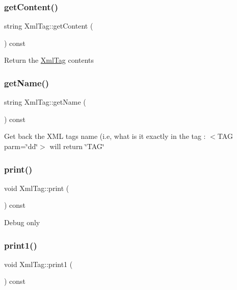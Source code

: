 \subsubsection{\texorpdfstring{get\+Content()}{getContent()}}
{\footnotesize\ttfamily string Xml\+Tag\+::get\+Content (\begin{DoxyParamCaption}{ }\end{DoxyParamCaption}) const}

Return the \hyperlink{classXmlTag}{Xml\+Tag} contents \mbox{\label{classXmlTag_a75a408a38dc1e24965b64bf46a23f57f}} 
\subsubsection{\texorpdfstring{get\+Name()}{getName()}}
{\footnotesize\ttfamily string Xml\+Tag\+::get\+Name (\begin{DoxyParamCaption}{ }\end{DoxyParamCaption}) const}

Get back the X\+ML tag\textquotesingle{}s name (i.\+e, what is it exactly in the tag \+: $<$\+T\+A\+G parm=\char`\"{}dd\char`\"{}$>$ will return \char`\"{}\+T\+A\+G\char`\"{} \mbox{\label{classXmlTag_a75522d91e1514e5180d66341dd92f4af}} 
\subsubsection{\texorpdfstring{print()}{print()}}
{\footnotesize\ttfamily void Xml\+Tag\+::print (\begin{DoxyParamCaption}{ }\end{DoxyParamCaption}) const}

Debug only \mbox{\label{classXmlTag_a240d1daa84c853ca638208ee26cd6842}} 
\subsubsection{\texorpdfstring{print1()}{print1()}}
{\footnotesize\ttfamily void Xml\+Tag\+::print1 (\begin{DoxyParamCaption}{ }\end{DoxyParamCaption}) const}

